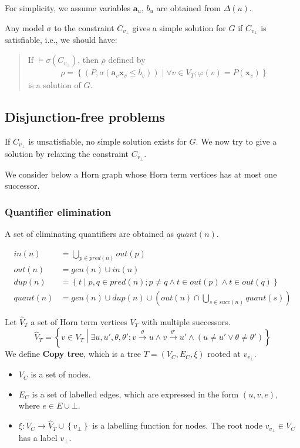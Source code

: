 \documentclass[a4paper,12pt]{article}
\newcommand{\edgel}[3]{#1\xrightarrow{#2}#3}
\begin{document}
For simplicity, we assume variables $\mathbf{a}_u$, $b_u$ are obtained
from $\Delta(u)$.

Any model $\sigma$ to the constraint $C_{v_\bot}$ gives a simple
solution for $G$ if $C_{v_\bot}$ is satisfiable, i.e., we should have:

\begin{quote}
If $\models \sigma(C_{v_\bot})$, then $\rho$ defined by
\begin{align*}
 \rho = \left\lbrace
  \left( P, \sigma(\mathbf{a}_v \mathbf{x}_v \leq b_v) \right) \middle|
  \forall v \in V_T; \varphi(v) = P(\mathbf{x}_v)
 \right\rbrace
\end{align*}
is a solution of $G$.
\end{quote}

\subsection{Disjunction-free problems}

If $C_{v_\bot}$ is unsatisfiable, no simple solution exists for
$G$. We now try to give a solution by relaxing the constraint
$C_{v_\bot}$.

We consider below a Horn graph whose Horn term vertices has at
most one successor.

\subsubsection{Quantifier elimination}

A set of eliminating quantifiers are obtained as $quant(n)$.

\begin{align*}
in(n) & = \bigcup_{p\in pred(n)} out(p) \\
out(n) & = gen(n) \cup in(n) \\
dup(n) & = \left\lbrace t \middle| p,q \in pred(n); p \ne q \wedge
 t \in out(p) \wedge t \in out(q) \right\rbrace \\
quant(n) & = gen(n) \cup dup(n) \cup
 (out(n) \cap \bigcup_{s \in succ(n)} quant(s))
\end{align*}

Let $\hat V_T$ a set of Horn term vertices $V_T$ with multiple
successors.
\[ \hat V_T = \left\lbrace v \in V_T \middle|
\exists u, u', \theta, \theta';
\edgel{v}{\theta}{u} \wedge \edgel{v}{\theta'}{u'} \wedge
(u \ne u' \vee \theta \ne \theta') \right\rbrace \]
We define \textbf{Copy tree}, which is a tree $T=(V_C,E_C,\xi)$
rooted at $v_{v_\bot}$.
\begin{itemize}
\item $V_C$ is a set of nodes.
\item $E_C$ is a set of labelled edges, which are expressed in the
  form $(u,v,e)$, where $e \in E \cup {\bot}$.
\item $\xi: V_C \rightarrow \hat V_T \cup \left\lbrace v_\bot
  \right\rbrace$ is a labelling function for nodes. The root node
  $v_{v_\bot} \in V_C$ has a label $v_\bot$.
\end{itemize}
\end{document}
